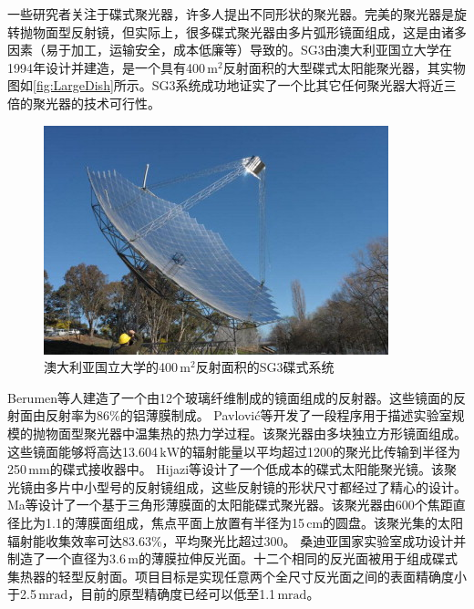 一些研究者关注于碟式聚光器，许多人提出不同形状的聚光器。完美的聚光器是旋转抛物面型反射镜，但实际上，很多碟式聚光器由多片弧形镜面组成，这是由诸多因素（易于加工，运输安全，成本低廉等）导致的。SG3由澳大利亚国立大学在1994年设计并建造，是一个具有400$\,\mathrm{m^2}$反射面积的大型碟式太阳能聚光器，其实物图如\autoref{fig:LargeDish}所示\cite{Lovegrove2011}。SG3系统成功地证实了一个比其它任何聚光器大将近三倍的聚光器的技术可行性。
\begin{figure}[!ht]
\centering
\includegraphics[width=.8\textwidth]{fig/largeDish.jpg}
\caption{澳大利亚国立大学的400$\,\mathrm{m^2}$反射面积的SG3碟式系统}\label{fig:LargeDish}
\end{figure}
Berumen等人\cite{Berumen2004}建造了一个由12个玻璃纤维制成的镜面组成的反射器。这些镜面的反射面由反射率为86\%的铝薄膜制成。
Pavlovi\'{c}等\cite{Pavlovic2014}开发了一段程序用于描述实验室规模的抛物面型聚光器中温集热的热力学过程。该聚光器由多块独立方形镜面组成。这些镜面能够将高达13.604$\,\mathrm{kW}$的辐射能量以平均超过1200的聚光比传输到半径为250$\,\mathrm{mm}$的碟式接收器中。
Hijazi等\cite{Hijazi2016}设计了一个低成本的碟式太阳能聚光镜。该聚光镜由多片中小型号的反射镜组成，这些反射镜的形状尺寸都经过了精心的设计。
Ma等\cite{Ma2012}设计了一个基于三角形薄膜面的太阳能碟式聚光器。该聚光器由600个焦距直径比为1.1的薄膜面组成，焦点平面上放置有半径为15$\,\mathrm{cm}$的圆盘。该聚光集的太阳辐射能收集效率可达83.63\%，平均聚光比超过300。
桑迪亚国家实验室\cite{Schertz1991}成功设计并制造了一个直径为3.6$\,\mathrm{m}$的薄膜拉伸反光面。十二个相同的反光面被用于组成碟式集热器的轻型反射面。项目目标是实现任意两个全尺寸反光面之间的表面精确度小于2.5$\,\mathrm{mrad}$，目前的原型精确度已经可以低至1.1$\,\mathrm{mrad}$。

